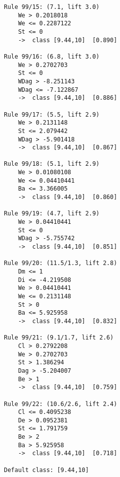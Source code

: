 \begin{tcolorbox}[title=Reglas de clasificación para identificar intervalos de notas.]
\begin{multicols}{3}
\begin{verbatim}
Rule 99/15: (7.1, lift 3.0)
	We > 0.2018018
	We <= 0.2287122
	St <= 0
	->  class [9.44,10]  [0.890]

Rule 99/16: (6.8, lift 3.0)
	We > 0.2702703
	St <= 0
	WDag > -8.251143
	WDag <= -7.122867
	->  class [9.44,10]  [0.886]

Rule 99/17: (5.5, lift 2.9)
	We > 0.2131148
	St <= 2.079442
	WDag > -5.901418
	->  class [9.44,10]  [0.867]

Rule 99/18: (5.1, lift 2.9)
	We > 0.01080108
	We <= 0.04410441
	Ba <= 3.366005
	->  class [9.44,10]  [0.860]

Rule 99/19: (4.7, lift 2.9)
	We > 0.04410441
	St <= 0
	WDag > -5.755742
	->  class [9.44,10]  [0.851]

Rule 99/20: (11.5/1.3, lift 2.8)
	Dm <= 1
	Di <= -4.219508
	We > 0.04410441
	We <= 0.2131148
	St > 0
	Ba <= 5.925958
	->  class [9.44,10]  [0.832]

Rule 99/21: (9.1/1.7, lift 2.6)
	Cl > 0.2792208
	We > 0.2702703
	St > 1.386294
	Dag > -5.204007
	Be > 1
	->  class [9.44,10]  [0.759]

Rule 99/22: (10.6/2.6, lift 2.4)
	Cl <= 0.4095238
	De > 0.0952381
	St <= 1.791759
	Be > 2
	Ba > 5.925958
	->  class [9.44,10]  [0.718]

Default class: [9.44,10]
    \end{verbatim}
  \end{multicols}
\end{tcolorbox}